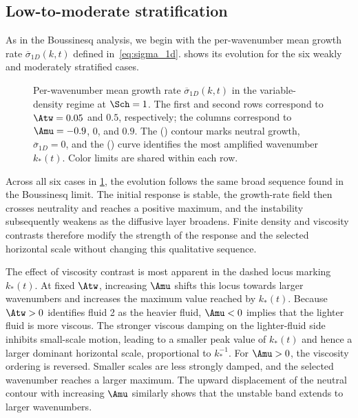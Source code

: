 \subsection{Low-to-moderate stratification}
\label{sec:vd_low_moderate}

As in the Boussinesq analysis, we begin with the per-wavenumber mean growth rate
\(\overline{\sigma}_{1D}(k,t)\) defined in~\eqref{eq:sigma_1d}. 
shows its evolution for the six weakly and moderately stratified cases.

\begin{figure}[p]
  \centering
  \caption{Per-wavenumber mean growth rate \(\overline{\sigma}_{1D}(k,t)\) in the
  variable-density regime at \(\Sch=1\). The first and second rows correspond to
  \(\Atw=0.05\) and \(0.5\), respectively; the columns correspond to \(\Amu=-0.9\), \(0\), and
  \(0.9\). The (\solidlegend) contour marks neutral growth, \(\overline{\sigma}_{1D}=0\), and the (\dashlegend)
  curve identifies the most amplified wavenumber \(k_\ast(t)\). Color limits are shared within
  each row.}
  \label{fig:VD_P1_sigma_map}
\end{figure}

Across all six cases in \cref{fig:VD_P1_sigma_map}, the evolution follows the same broad
sequence found in the Boussinesq limit. The initial response is stable, the growth-rate field then
crosses neutrality and reaches a positive maximum, and the instability subsequently weakens as
the diffusive layer broadens. Finite density and viscosity contrasts therefore modify the strength
of the response and the selected horizontal scale without changing this qualitative sequence.

The effect of viscosity contrast is most apparent in the dashed locus marking \(k_\ast(t)\).
At fixed \(\Atw\), increasing \(\Amu\) shifts this locus towards larger wavenumbers and increases
the maximum value reached by \(k_\ast(t)\). Because \(\Atw>0\) identifies fluid 2 as the heavier
fluid, \(\Amu<0\) implies that the lighter fluid is more viscous. The stronger viscous damping on
the lighter-fluid side inhibits small-scale motion, leading to a smaller peak value of
\(k_\ast(t)\) and hence a larger dominant horizontal scale, proportional to \(k_\ast^{-1}\).
For \(\Amu>0\), the viscosity ordering is reversed. Smaller scales are less strongly damped, and
the selected wavenumber reaches a larger maximum. The upward displacement of the neutral contour
with increasing \(\Amu\) similarly shows that the unstable band extends to larger wavenumbers.

